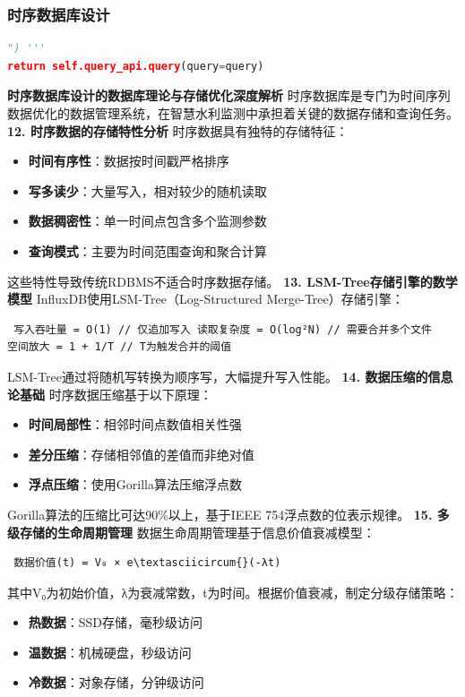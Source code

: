 \subsubsection{时序数据库设计}\label{ux65f6ux5e8fux6570ux636eux5e93ux8bbeux8ba1} \begin{lstlisting}[language=Python] ") '''
return self.query_api.query(query=query) \end{lstlisting} \textbf{时序数据库设计的数据库理论与存储优化深度解析}
时序数据库是专门为时间序列数据优化的数据管理系统，在智慧水利监测中承担着关键的数据存储和查询任务。 \textbf{12. 时序数据的存储特性分析} 时序数据具有独特的存储特征： \begin{itemize} \tightlist
\item \textbf{时间有序性}：数据按时间戳严格排序 \item \textbf{写多读少}：大量写入，相对较少的随机读取 \item \textbf{数据稠密性}：单一时间点包含多个监测参数 \item
\textbf{查询模式}：主要为时间范围查询和聚合计算 \end{itemize} 这些特性导致传统RDBMS不适合时序数据存储。 \textbf{13. LSM-Tree存储引擎的数学模型}
InfluxDB使用LSM-Tree（Log-Structured Merge-Tree）存储引擎： \begin{lstlisting} 写入吞吐量 = O(1) // 仅追加写入 读取复杂度 = O(log²N) // 需要合并多个文件
空间放大 = 1 + 1/T // T为触发合并的阈值 \end{lstlisting} LSM-Tree通过将随机写转换为顺序写，大幅提升写入性能。 \textbf{14. 数据压缩的信息论基础} 时序数据压缩基于以下原理：
\begin{itemize} \tightlist \item \textbf{时间局部性}：相邻时间点数值相关性强 \item \textbf{差分压缩}：存储相邻值的差值而非绝对值 \item
\textbf{浮点压缩}：使用Gorilla算法压缩浮点数 \end{itemize} Gorilla算法的压缩比可达90\%以上，基于IEEE 754浮点数的位表示规律。 \textbf{15. 多级存储的生命周期管理}
数据生命周期管理基于信息价值衰减模型： \begin{lstlisting} 数据价值(t) = V₀ × e\textasciicircum{}(-λt) \end{lstlisting}
其中V₀为初始价值，λ为衰减常数，t为时间。根据价值衰减，制定分级存储策略： \begin{itemize} \tightlist \item \textbf{热数据}：SSD存储，毫秒级访问 \item
\textbf{温数据}：机械硬盘，秒级访问\\ \item \textbf{冷数据}：对象存储，分钟级访问 \end{itemize}
